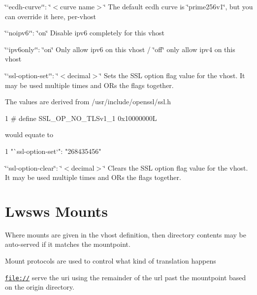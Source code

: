 \begin{DoxyItemize}
\item \char`\"{}`ecdh-\/curve`\char`\"{}\+: \char`\"{}$<$curve name$>$\char`\"{} The default ecdh curve is \char`\"{}prime256v1\char`\"{}, but you can override it here, per-\/vhost
\item \char`\"{}`noipv6`\char`\"{}\+: \char`\"{}on\char`\"{} Disable ipv6 completely for this vhost
\item \char`\"{}`ipv6only`\char`\"{}\+: \char`\"{}on\char`\"{} Only allow ipv6 on this vhost / \char`\"{}off\char`\"{} only allow ipv4 on this vhost
\item \char`\"{}`ssl-\/option-\/set`\char`\"{}\+: \char`\"{}$<$decimal$>$\char`\"{} Sets the S\+SL option flag value for the vhost. It may be used multiple times and OR\textquotesingle{}s the flags together.
\end{DoxyItemize}

The values are derived from /usr/include/openssl/ssl.h 
\begin{DoxyCode}
1 # define SSL\_OP\_NO\_TLSv1\_1                               0x10000000L
\end{DoxyCode}


would equate to


\begin{DoxyCode}
1 "`ssl-option-set`": "268435456"
\end{DoxyCode}

\begin{DoxyItemize}
\item \char`\"{}`ssl-\/option-\/clear\textquotesingle{}\char`\"{}\+: \char`\"{}$<$decimal$>$\char`\"{} Clears the S\+SL option flag value for the vhost. It may be used multiple times and OR\textquotesingle{}s the flags together.
\end{DoxyItemize}\hypertarget{md_README.lwsws_lwswsm}{}\section{Lwsws Mounts}\label{md_README.lwsws_lwswsm}
Where mounts are given in the vhost definition, then directory contents may be auto-\/served if it matches the mountpoint.

Mount protocols are used to control what kind of translation happens


\begin{DoxyItemize}
\item \href{file://}{\tt file\+://} serve the uri using the remainder of the url past the mountpoint based on the origin directory.
\end{DoxyItemize}

